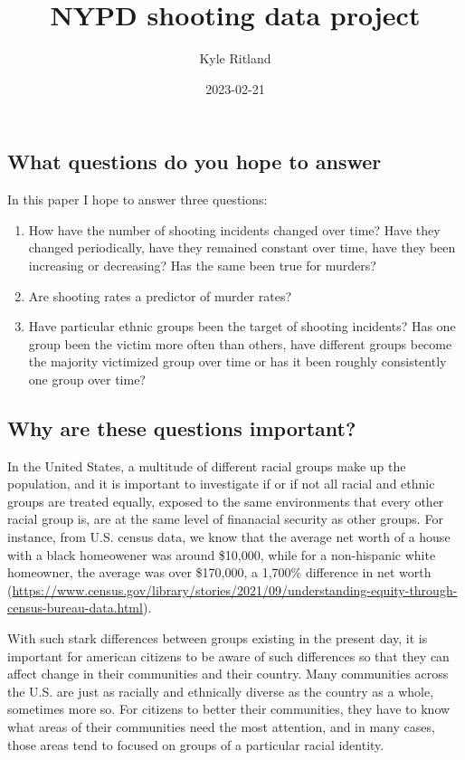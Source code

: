 \documentclass[
]{article}
\title{NYPD shooting data project}
\author{Kyle Ritland}
\date{2023-02-21}
\begin{document}
\maketitle

\hypertarget{what-questions-do-you-hope-to-answer}{%
\subsection{What questions do you hope to
answer}\label{what-questions-do-you-hope-to-answer}}

In this paper I hope to answer three questions:

\begin{enumerate}
\def\labelenumi{\arabic{enumi}.}
\item
  How have the number of shooting incidents changed over time? Have they
  changed periodically, have they remained constant over time, have they
  been increasing or decreasing? Has the same been true for murders?
\item
  Are shooting rates a predictor of murder rates?
\item
  Have particular ethnic groups been the target of shooting incidents?
  Has one group been the victim more often than others, have different
  groups become the majority victimized group over time or has it been
  roughly consistently one group over time?
\end{enumerate}

\hypertarget{why-are-these-questions-important}{%
\subsection{Why are these questions
important?}\label{why-are-these-questions-important}}

In the United States, a multitude of different racial groups make up the
population, and it is important to investigate if or if not all racial
and ethnic groups are treated equally, exposed to the same environments
that every other racial group is, are at the same level of finanacial
security as other groups. For instance, from U.S. census data, we know
that the average net worth of a house with a black homeowener was around
\$10,000, while for a non-hispanic white homeowner, the average was over
\$170,000, a 1,700\% difference in net worth
(\url{https://www.census.gov/library/stories/2021/09/understanding-equity-through-census-bureau-data.html}).

With such stark differences between groups existing in the present day,
it is important for american citizens to be aware of such differences so
that they can affect change in their communities and their country. Many
communities across the U.S. are just as racially and ethnically diverse
as the country as a whole, sometimes more so. For citizens to better
their communities, they have to know what areas of their communities
need the most attention, and in many cases, those areas tend to focused
on groups of a particular racial identity.
\end{document}

